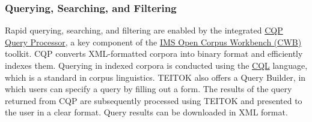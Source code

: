 \documentclass[
]{article}
\begin{document}
\hypertarget{querying-searching-and-filtering}{%
\subsubsection{Querying, Searching, and
Filtering}\label{querying-searching-and-filtering}}

Rapid querying, searching, and filtering are enabled by the integrated
\href{https://cwb.sourceforge.io/files/CQP_Manual.pdf}{CQP Query
Processor}, a key component of the
\href{https://cwb.sourceforge.io/}{IMS Open Corpus Workbench (CWB)}
toolkit. CQP converts XML-formatted corpora into binary format and
efficiently indexes them. Querying in indexed corpora is conducted using
the
\href{https://www.cambridge.org/sketch/help/userguides/CQL\%20Help\%201.3.pdf}{CQL}
language, which is a standard in corpus linguistics. TEITOK also offers
a Query Builder, in which users can specify a query by filling out a
form. The results of the query returned from CQP are subsequently
processed using TEITOK and presented to the user in a clear format.
Query results can be downloaded in XML format.
\end{document}
